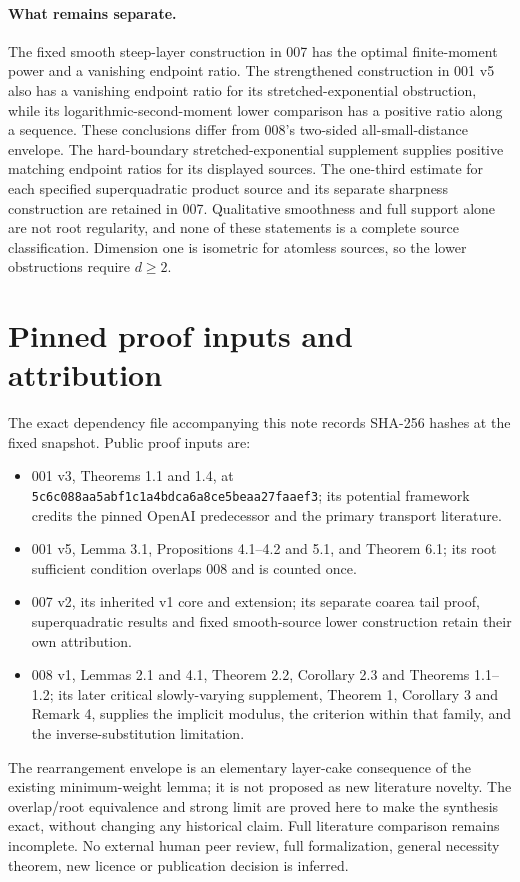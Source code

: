 \documentclass[11pt]{article}
\theoremstyle{remark}\newtheorem{remark}[theorem]{Remark}
\begin{document}
\paragraph{What remains separate.} The fixed smooth steep-layer construction in 007 has the optimal finite-moment power and a vanishing endpoint ratio. The strengthened construction in 001 v5 also has a vanishing endpoint ratio for its stretched-exponential obstruction, while its logarithmic-second-moment lower comparison has a positive ratio along a sequence. These conclusions differ from 008's two-sided all-small-distance envelope. The hard-boundary stretched-exponential supplement supplies positive matching endpoint ratios for its displayed sources. The one-third estimate for each specified superquadratic product source and its separate sharpness construction are retained in 007. Qualitative smoothness and full support alone are not root regularity, and none of these statements is a complete source classification. Dimension one is isometric for atomless sources, so the lower obstructions require $d\ge2$.

\section*{Pinned proof inputs and attribution}
\begingroup\small
The exact dependency file accompanying this note records SHA-256 hashes at the fixed snapshot. Public proof inputs are:
\begin{itemize}
\item 001 v3, Theorems 1.1 and 1.4, at \texttt{5c6c088aa5abf1c1a4bdca6a8ce5beaa27faaef3}; its potential framework credits the pinned OpenAI predecessor and the primary transport literature.
\item 001 v5, Lemma 3.1, Propositions 4.1--4.2 and 5.1, and Theorem 6.1; its root sufficient condition overlaps 008 and is counted once.
\item 007 v2, its inherited v1 core and extension; its separate coarea tail proof, superquadratic results and fixed smooth-source lower construction retain their own attribution.
\item 008 v1, Lemmas 2.1 and 4.1, Theorem 2.2, Corollary 2.3 and Theorems 1.1--1.2; its later critical slowly-varying supplement, Theorem 1, Corollary 3 and Remark 4, supplies the implicit modulus, the criterion within that family, and the inverse-substitution limitation.
\end{itemize}
The rearrangement envelope is an elementary layer-cake consequence of the existing minimum-weight lemma; it is not proposed as new literature novelty. The overlap/root equivalence and strong limit are proved here to make the synthesis exact, without changing any historical claim. Full literature comparison remains incomplete. No external human peer review, full formalization, general necessity theorem, new licence or publication decision is inferred.
\endgroup
\end{document}

